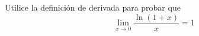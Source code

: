\item Utilice la definición de derivada para probar que
    $$\lim_{x \to 0} \frac{\ln(1 + x)}{x} = 1$$
